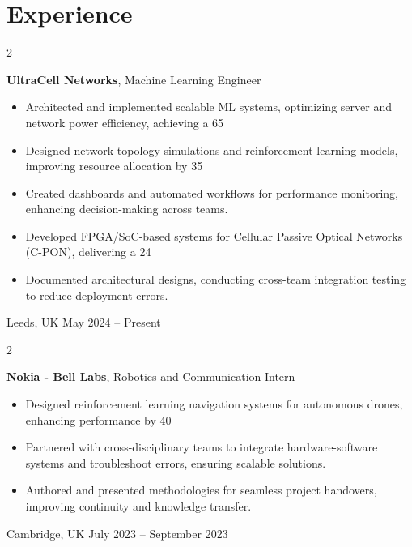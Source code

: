 \documentclass[10pt, letterpaper]{article}
\newenvironment{twocolentry}[2][]{
\onecolentry
\def\secondColumn{#2}
\setcolumnwidth{\fill, 4.5 cm}
\begin{paracol}{2}
}{
\switchcolumn \raggedleft \secondColumn
\end{paracol}
\endonecolentry
} %
\begin{document}
\medskip

\section{Experience}

\begin{twocolentry}{
Leeds, UK
May 2024 – Present
}
\textbf{UltraCell Networks}, Machine Learning Engineer
\begin{itemize}

\item Architected and implemented scalable ML systems, optimizing server and network power efficiency, achieving a 65%
\item Designed network topology simulations and reinforcement learning models, improving resource allocation by 35%
\item Created dashboards and automated workflows for performance monitoring, enhancing decision-making across teams. 
\item Developed FPGA/SoC-based systems for Cellular Passive Optical Networks (C-PON), delivering a 24%
\item Documented architectural designs, conducting cross-team integration testing to reduce deployment errors. 
\end{itemize}



\end{twocolentry}
\vspace{0.2 cm}

\begin{twocolentry}{
Cambridge, UK
July 2023 – September 2023
}
\textbf{Nokia - Bell Labs}, Robotics and Communication Intern
\begin{itemize}

\item Designed reinforcement learning navigation systems for autonomous drones, enhancing performance by 40%
\item Partnered with cross-disciplinary teams to integrate hardware-software systems and troubleshoot errors, ensuring scalable solutions. 
\item Authored and presented methodologies for seamless project handovers, improving continuity and knowledge transfer. 
\end{itemize}



\end{twocolentry}
\vspace{0.2 cm}
\end{document}
